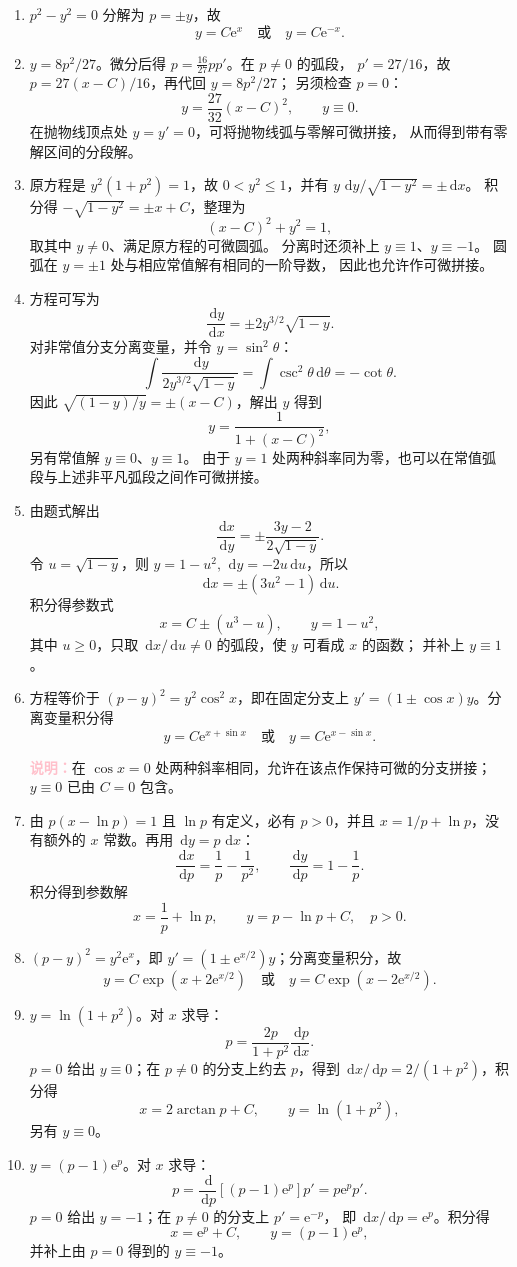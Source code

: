 \documentclass[UTF8,a4paper,11pt]{ctexart}
\newcommand{\dd}{\,\mathrm d}
\newcommand{\e}{\mathrm e}
\newcommand{\note}[1]{\par\smallskip\noindent\textcolor{pink}{\bfseries 说明：}#1\par\smallskip}
\begin{document}
\begin{solution}
\begin{enumerate}[label=(\arabic*)]
\item $p^2-y^2=0$ 分解为 $p=\pm y$，故
\[
\boxed{y=C\e^x\quad\text{或}\quad y=C\e^{-x}}.
\]
\item $y=8p^2/27$。微分后得
$p=\frac{16}{27}pp'$。在 $p\ne0$ 的弧段，
$p'=27/16$，故 $p=27(x-C)/16$，再代回 $y=8p^2/27$；
另须检查 $p=0$：
\[
\boxed{y=\frac{27}{32}(x-C)^2},\qquad \boxed{y\equiv0}.
\]
在抛物线顶点处 $y=y'=0$，可将抛物线弧与零解可微拼接，
从而得到带有零解区间的分段解。
\item 原方程是 $y^2(1+p^2)=1$，故 $0<y^2\le1$，并有
$y\,\dd y/\sqrt{1-y^2}=\pm\dd x$。
积分得 $-\sqrt{1-y^2}=\pm x+C$，整理为
\[
\boxed{(x-C)^2+y^2=1},
\]
取其中 $y\ne0$、满足原方程的可微圆弧。
分离时还须补上 $\boxed{y\equiv1}$、$\boxed{y\equiv-1}$。
圆弧在 $y=\pm1$ 处与相应常值解有相同的一阶导数，
因此也允许作可微拼接。
\item 方程可写为
\[
\frac{\dd y}{\dd x}=\pm2y^{3/2}\sqrt{1-y}.
\]
对非常值分支分离变量，并令 $y=\sin^2\theta$：
\[
\int\frac{\dd y}{2y^{3/2}\sqrt{1-y}}
=\int\csc^2\theta\dd\theta=-\cot\theta.
\]
因此 $\sqrt{(1-y)/y}=\pm(x-C)$，解出 $y$ 得到
\[
\boxed{y=\frac1{1+(x-C)^2}},
\]
另有常值解 $\boxed{y\equiv0}$、$\boxed{y\equiv1}$。
由于 $y=1$ 处两种斜率同为零，也可以在常值弧段与上述非平凡弧段之间作可微拼接。
\item 由题式解出
\[
\frac{\dd x}{\dd y}=\pm\frac{3y-2}{2\sqrt{1-y}}.
\]
令 $u=\sqrt{1-y}$，则 $y=1-u^2,\ \dd y=-2u\dd u$，所以
\[
\dd x=\pm(3u^2-1)\dd u.
\]
积分得参数式
\[
\boxed{x=C\pm(u^3-u),\qquad y=1-u^2},
\]
其中 $u\ge0$，只取 $\dd x/\dd u\ne0$ 的弧段，使 $y$ 可看成 $x$ 的函数；
并补上 $\boxed{y\equiv1}$。
\item 方程等价于 $(p-y)^2=y^2\cos^2x$，即在固定分支上
$y'=(1\pm\cos x)y$。分离变量积分得
\[
\boxed{y=C\e^{x+\sin x}\quad\text{或}\quad y=C\e^{x-\sin x}}.
\]
\note{在 $\cos x=0$ 处两种斜率相同，允许在该点作保持可微的分支拼接；$y\equiv0$ 已由 $C=0$ 包含。}
\item 由 $p(x-\ln p)=1$ 且 $\ln p$ 有定义，必有 $p>0$，并且
$x=1/p+\ln p$，没有额外的 $x$ 常数。再用
$\dd y=p\,\dd x$：
\[
\frac{\dd x}{\dd p}=\frac1p-\frac1{p^2},
\qquad
\frac{\dd y}{\dd p}=1-\frac1p.
\]
积分得到参数解
\[
\boxed{x=\frac1p+\ln p,\qquad y=p-\ln p+C},\quad p>0.
\]
\item $(p-y)^2=y^2\e^x$，即
$y'=(1\pm\e^{x/2})y$；分离变量积分，故
\[
\boxed{y=C\exp\!\left(x+2\e^{x/2}\right)
\quad\text{或}\quad
y=C\exp\!\left(x-2\e^{x/2}\right)}.
\]
\item $y=\ln(1+p^2)$。对 $x$ 求导：
\[
p=\frac{2p}{1+p^2}\frac{\dd p}{\dd x}.
\]
$p=0$ 给出 $y\equiv0$；在 $p\ne0$ 的分支上约去 $p$，得到
$\dd x/\dd p=2/(1+p^2)$，积分得
\[
\boxed{x=2\arctan p+C,\qquad y=\ln(1+p^2)},
\]
另有 $\boxed{y\equiv0}$。
\item $y=(p-1)\e^p$。对 $x$ 求导：
\[
p=\frac{\dd}{\dd p}[(p-1)\e^p]p'=p\e^p p'.
\]
$p=0$ 给出 $y=-1$；在 $p\ne0$ 的分支上 $p'=\e^{-p}$，
即 $\dd x/\dd p=\e^p$。积分得
\[
\boxed{x=\e^p+C,\qquad y=(p-1)\e^p},
\]
并补上由 $p=0$ 得到的 $\boxed{y\equiv-1}$。
\end{enumerate}
\end{solution}
\end{document}
